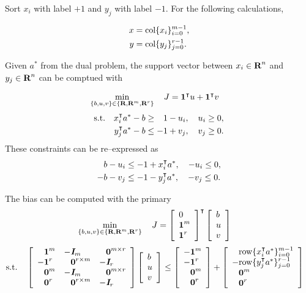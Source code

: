\documentclass{article}
\begin{document}
    Sort $x_i$ with label $+1$ 
    and $y_j$ with label $-1$.
    For the following calculations,

    \begin{align*}
        x &= \text{col}\{x_i\}_{i=0}^{m-1},
        \\
        y &= \text{col}\{y_j\}_{j=0}^{r-1}.
    \end{align*}

    Given $a^*$ from the dual problem, 
    the support vector between $x_i\in\textbf{R}^n$ and $y_j\in\textbf{R}^n$
    can be comptued with

    \begin{align*}
        \min_{\{b,u,v\}\in\{\textbf{R},\textbf{R}^m,\textbf{R}^r\}} \quad 
        J & = \textbf{1}^\intercal u + \textbf{1}^\intercal v
    \end{align*}
    \begin{align*}
        \st\quad x_i^\tp a^* - b &\geq \minus 1-u_i,\quad u_i\geq 0,\\
                y_j^\tp a^* - b &\leq -1+v_j,\quad v_j\geq 0.
    \end{align*}    
    These constraints can be re--expressed as
    \begin{align*}
        b - u_i &\leq -1+x_i^\intercal a^*,\quad -u_i\leq 0,\\
        - b -v_j &\leq -1-y_j^\intercal a^*,\quad -v_j\leq 0.
    \end{align*}   
    
    The bias can be computed with the primary \LP
    \begin{align*}
        \min_{\{b,u,v\}\in\{\textbf{R},\textbf{R}^m,\textbf{R}^r\}}  \quad J 
        & = \left[\begin{array}{lllllllllllllllllll}
            0\\
            \textbf{1}^{m}\\
            \textbf{1}^{r}
        \end{array}\right]^\intercal
        \left[\begin{array}{lllllllllllllllllll}
            b\\
            u\\
            v\\
        \end{array}\right]
    \end{align*}
    \begin{align*}
        \st\quad
        \mat{
            \minus\ones^m & -\eye_m & \minus\zeros^{m\times r}\\
            -\ones^r & \minus\zeros^{r\times m} & -\eye_r \\
            \minus\zeros^m & -\eye_m & \minus\zeros^{m\times r}\\
            \minus\zeros^r & \minus\zeros^{r\times m} & -\eye_r
        }
        &\mat{b \\ u \\ v}
        \leq
        \mat{
            -\ones^m\\ 
            -\ones^r\\
            \minus\zeros^m\\
            \minus\zeros^r
            }
        +\mat{
            \minus\row\{x_i^\tp a^*\}_{i=0}^{m-1}\\
            -\row\{y_j^\tp a^*\}_{j=0}^{r-1}\\
            \minus\zeros^m\\
            \minus\zeros^r            
            }
    \end{align*}
\end{document}
